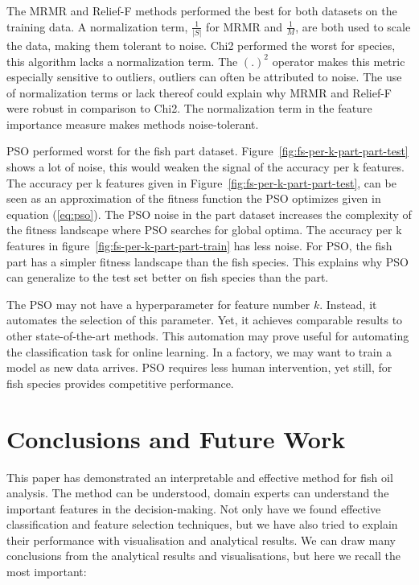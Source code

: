 \documentclass[runningheads]{llncs}
\begin{document}
The MRMR and Relief-F methods performed the best for both datasets on the training data. 
A normalization term, $\frac{1}{|S|}$ for MRMR and $\frac{1}{M}$, are both used to scale the data, making them tolerant to noise. 
Chi2 performed the worst for species, this algorithm lacks a normalization term.
The $(.)^2$ operator makes this metric especially sensitive to outliers, outliers can often be attributed to noise. 
The use of normalization terms or lack thereof could explain why MRMR and Relief-F were robust in comparison to Chi2. 
The normalization term in the feature importance measure makes methods noise-tolerant. 

PSO performed worst for the fish part dataset.
Figure~\ref{fig:fs-per-k-part-part-test} shows a lot of noise, this would weaken the signal of the accuracy per k features. 
The accuracy per k features given in Figure~\ref{fig:fs-per-k-part-part-test}, can be seen as an approximation of the fitness function the PSO optimizes given in equation (\ref{eq:pso}).
The PSO noise in the part dataset increases the complexity of the fitness landscape where PSO searches for global optima. 
The accuracy per k features in figure~\ref{fig:fs-per-k-part-part-train} has less noise. 
For PSO, the fish part has a simpler fitness landscape than the fish species.
This explains why PSO can generalize to the test set better on fish species than the part. 

The PSO may not have a hyperparameter for feature number $k$.
Instead, it automates the selection of this parameter.
Yet, it achieves comparable results to other state-of-the-art methods.
This automation may prove useful for automating the classification task for online learning.
In a factory, we may want to train a model as new data arrives.
PSO requires less human intervention, yet still, for fish species provides competitive performance.

\section{Conclusions and Future Work}


This paper has demonstrated an interpretable and effective method for fish oil analysis. 
The method can be understood, domain experts can understand the important features in the decision-making.
Not only have we found effective classification and feature selection techniques, but we have also tried to explain their performance with visualisation and analytical results. 
We can draw many conclusions from the analytical results and visualisations, but here we recall the most important:
\end{document}
